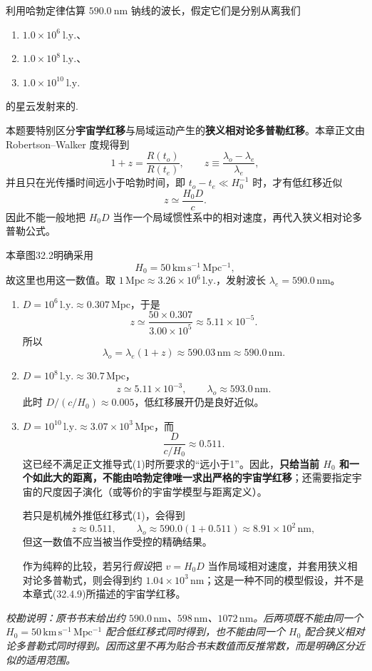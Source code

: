 \begin{exercise}\label{ex:32.1}
利用哈勃定律估算 $590.0 \ \mathrm{nm}$ 钠线的波长，假定它们是分别从离我们
\begin{enumerate}
  \item[(a)] $1.0 \times 10^6 \ \mathrm{l.y.}$、
  \item[(b)] $1.0 \times 10^8 \ \mathrm{l.y.}$、
  \item[(c)] $1.0 \times 10^{10} \ \mathrm{l.y.}$
\end{enumerate}
的星云发射来的.
\end{exercise}
\begin{solution}
本题要特别区分\textbf{宇宙学红移}与局域运动产生的\textbf{狭义相对论多普勒红移}。本章正文由 Robertson--Walker 度规得到
\[
1+z=\frac{R(t_o)}{R(t_e)},
\qquad
z\equiv\frac{\lambda_o-\lambda_e}{\lambda_e},
\]
并且只在光传播时间远小于哈勃时间，即 $t_o-t_e\ll H_0^{-1}$ 时，才有低红移近似
\[
z\simeq\frac{H_0D}{c}.
\tag{1}
\]
因此不能一般地把 $H_0D$ 当作一个局域惯性系中的相对速度，再代入狭义相对论多普勒公式。

本章图32.2明确采用
\[
H_0=50\,\mathrm{km\,s^{-1}\,Mpc^{-1}},
\]
故这里也用这一数值。取
$1\,\mathrm{Mpc}\approx3.26\times10^6\,\mathrm{l.y.}$，发射波长
$\lambda_e=590.0\,\mathrm{nm}$。

\begin{enumerate}
\item[(a)] $D=10^6\,\mathrm{l.y.}\approx0.307\,\mathrm{Mpc}$，于是
\[
z\simeq\frac{50\times0.307}{3.00\times10^5}
\approx5.11\times10^{-5}.
\]
所以
\[
\boxed{\lambda_o=\lambda_e(1+z)\approx590.03\,\mathrm{nm}\approx590.0\,\mathrm{nm}}.
\]

\item[(b)] $D=10^8\,\mathrm{l.y.}\approx30.7\,\mathrm{Mpc}$，
\[
z\simeq5.11\times10^{-3},
\qquad
\boxed{\lambda_o\approx593.0\,\mathrm{nm}}.
\]
此时 $D/(c/H_0)\approx0.005$，低红移展开仍是良好近似。

\item[(c)] $D=10^{10}\,\mathrm{l.y.}\approx3.07\times10^3\,\mathrm{Mpc}$，而
\[
\frac{D}{c/H_0}\approx0.511.
\]
这已经不满足正文推导式(1)时所要求的“远小于1”。因此，\textbf{只给当前 $H_0$ 和一个如此大的距离，不能由哈勃定律唯一求出严格的宇宙学红移}；还需要指定宇宙的尺度因子演化（或等价的宇宙学模型与距离定义）。

若只是机械外推低红移式(1)，会得到
\[
z\approx0.511,
\qquad
\lambda_o\approx590.0(1+0.511)\approx\boxed{8.91\times10^2\,\mathrm{nm}},
\]
但这一数值不应当被当作受控的精确结果。

作为纯粹的比较，若另行\emph{假设}把 $v=H_0D$ 当作局域相对速度，并套用狭义相对论多普勒式，则会得到约
$1.04\times10^3\,\mathrm{nm}$；这是一种不同的模型假设，并不是本章式(32.4.9)所描述的宇宙学红移。
\end{enumerate}

\textit{校勘说明：原书书末给出约 $590.0\,\mathrm{nm}$、$598\,\mathrm{nm}$、$1072\,\mathrm{nm}$。后两项既不能由同一个 $H_0=50\,\mathrm{km\,s^{-1}\,Mpc^{-1}}$ 配合低红移式同时得到，也不能由同一个 $H_0$ 配合狭义相对论多普勒式同时得到。因而这里不再为贴合书末数值而反推常数，而是明确区分近似的适用范围。}
\end{solution}

